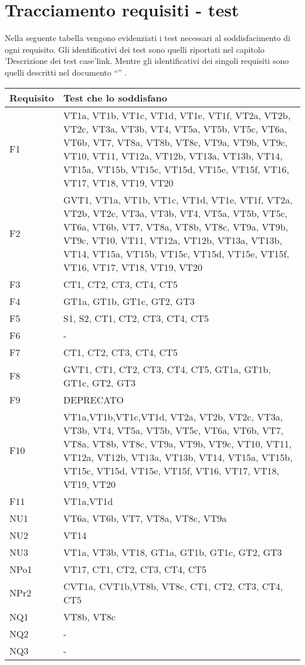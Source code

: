 \section{Tracciamento requisiti - test}
Nella seguente tabella vengono evidenziati i test necessari al soddisfacimento di ogni requisito. Gli identificativi dei test sono quelli riportati nel capitolo 'Descrizione dei test case'{link}. Mentre gli identificativi dei singoli requisiti sono quelli descritti nel documento ``\AR'' .
 \begin{center}
\begin{tabular}{|p{3cm}|p{8cm}|} \hline
\textbf{Requisito} & \textbf{Test che lo soddisfano}\\ \hline
F1  & VT1a, VT1b, VT1c, VT1d, VT1e, VT1f, VT2a, VT2b, VT2c, VT3a, VT3b, VT4, VT5a, VT5b, VT5c, VT6a, VT6b, VT7, VT8a, VT8b, VT8c, VT9a, VT9b, VT9c, VT10, VT11, VT12a, VT12b, VT13a, VT13b, VT14, VT15a, VT15b, VT15c, VT15d, VT15e, VT15f, VT16, VT17, VT18, VT19, VT20\\ \hline
F2  & GVT1, VT1a, VT1b, VT1c, VT1d, VT1e, VT1f, VT2a, VT2b, VT2c, VT3a, VT3b, VT4, VT5a, VT5b, VT5c, VT6a, VT6b, VT7, VT8a, VT8b, VT8c, VT9a, VT9b, VT9c, VT10, VT11, VT12a, VT12b, VT13a, VT13b, VT14, VT15a, VT15b, VT15c, VT15d, VT15e, VT15f, VT16, VT17, VT18, VT19, VT20\\ \hline
F3  & CT1, CT2, CT3, CT4, CT5 \\ \hline
F4  & GT1a, GT1b, GT1c, GT2, GT3\\ \hline
F5  & S1, S2, CT1, CT2, CT3, CT4, CT5 \\ \hline
F6  &  - \\ \hline
F7  & CT1, CT2, CT3, CT4, CT5  \\ \hline
F8  & GVT1, CT1, CT2, CT3, CT4, CT5, GT1a, GT1b, GT1c, GT2, GT3  \\ \hline
F9  &  DEPRECATO\\ \hline
F10 & VT1a,VT1b,VT1c,VT1d, VT2a, VT2b, VT2c, VT3a, VT3b, VT4, VT5a, VT5b, VT5c, VT6a, VT6b, VT7, VT8a, VT8b, VT8c, VT9a, VT9b, VT9c, VT10, VT11, VT12a, VT12b, VT13a, VT13b, VT14, VT15a, VT15b, VT15c, VT15d, VT15e, VT15f, VT16, VT17, VT18, VT19, VT20 \\ \hline
F11 & VT1a,VT1d \\ \hline
NU1 & VT6a, VT6b, VT7, VT8a, VT8c, VT9a\\ \hline
NU2 & VT14\\ \hline
NU3 & VT1a, VT3b, VT18, GT1a, GT1b, GT1c, GT2, GT3\\ \hline
NPo1 &  VT17, CT1, CT2, CT3, CT4, CT5 \\ \hline
NPr2 &  CVT1a, CVT1b,VT8b, VT8c, CT1, CT2, CT3, CT4, CT5 \\ \hline
NQ1 & VT8b, VT8c  \\ \hline
NQ2 &  - \\ \hline
NQ3 &  - \\ \hline
\end{tabular} \\
\end{center}

